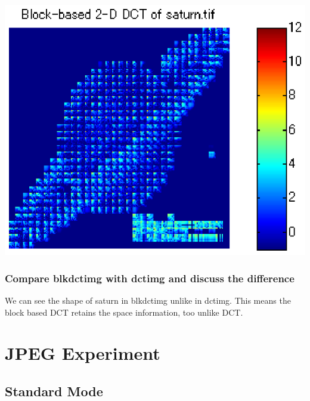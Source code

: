\documentclass[12pt]{article}
\begin{document}
\begin{center}
\includegraphics{../images/II3blkdctimg.eps}
\end{center}

\subsubsection{Compare blkdctimg with dctimg and discuss the difference}

We can see the shape of saturn in blkdctimg unlike in dctimg.  
This means the block based DCT retains the space information, too unlike DCT. 

\section{JPEG Experiment}
\subsection{Standard Mode}
\end{document}
